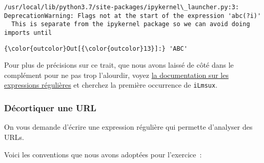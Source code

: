     \begin{Verbatim}[commandchars=\\\{\}]
/usr/local/lib/python3.7/site-packages/ipykernel\_launcher.py:3: DeprecationWarning: Flags not at the start of the expression 'abc(?i)'
  This is separate from the ipykernel package so we can avoid doing imports until

    \end{Verbatim}

\begin{Verbatim}[commandchars=\\\{\}]
{\color{outcolor}Out[{\color{outcolor}13}]:} 'ABC'
\end{Verbatim}
            
    Pour plus de précisions sur ce trait, que nous avons laissé de côté dans
le complément pour ne pas trop l'alourdir, voyez
\href{https://docs.python.org/3/library/re.html\#regular-expression-syntax}{la
documentation sur les expressions régulières} et cherchez la première
occurrence de \texttt{iLmsux}.

    \hypertarget{duxe9cortiquer-une-url}{%
\subsubsection{Décortiquer une URL}\label{duxe9cortiquer-une-url}}

    On vous demande d'écrire une expression régulière qui permette
d'analyser des URLs.

Voici les conventions que nous avons adoptées pour l'exercice~:

